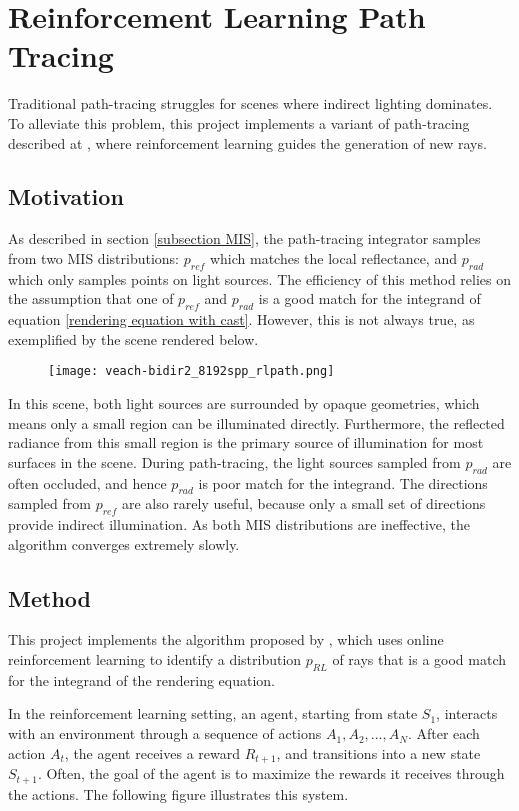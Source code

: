 \chapter{Reinforcement Learning Path Tracing}
\label{chapter RL}
Traditional path-tracing struggles for scenes where indirect lighting dominates. To alleviate this problem, this project implements a variant of path-tracing described at \cite{RLPT}, where reinforcement learning guides the generation of new rays.

\section{Motivation}
As described in section \ref{subsection MIS}, the path-tracing integrator samples from two MIS distributions: $p_{ref}$ which matches the local reflectance, and $p_{rad}$ which only samples points on light sources. The efficiency of this method relies on the assumption that one of $p_{ref}$ and $p_{rad}$ is a good match for the integrand of equation \ref{rendering equation with cast}. However, this is not always true, as exemplified by the scene rendered below.

\begin{figure}[H]
    \centering
    \texttt{[image: veach-bidir2\_8192spp\_rlpath.png]}
\end{figure}

In this scene, both light sources are surrounded by opaque geometries, which means only a small region can be illuminated directly. Furthermore, the reflected radiance from this small region is the primary source of illumination for most surfaces in the scene. During path-tracing, the light sources sampled from $p_{rad}$ are often occluded, and hence $p_{rad}$ is poor match for the integrand. The directions sampled from $p_{ref}$ are also rarely useful, because only a small set of directions provide indirect illumination. As both MIS distributions are ineffective, the algorithm converges extremely slowly.

\section{Method}
This project implements the algorithm proposed by \cite{RLPT}, which uses online reinforcement learning to identify a distribution $p_{RL}$ of rays that is a good match for the integrand of the rendering equation.

In the reinforcement learning setting, an agent, starting from state $S_1$, interacts with an environment through a sequence of actions $A_1,A_2,...,A_N$. After each action $A_t$, the agent receives a reward $R_{t+1}$, and transitions into a new state $S_{t+1}$. Often, the goal of the agent is to maximize the rewards it receives through the actions. The following figure illustrates this system.


